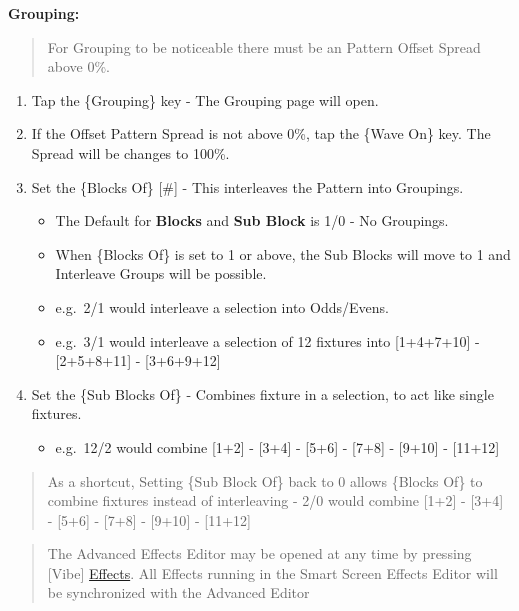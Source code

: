 \documentclass[
]{article}
\providecommand{\tightlist}{%
  \setlength{\itemsep}{0pt}\setlength{\parskip}{0pt}}
\begin{document}
\textbf{Grouping:}

\begin{quote}
For Grouping to be noticeable there must be an Pattern Offset Spread above 0\%.
\end{quote}

\begin{enumerate}
\def\labelenumi{\arabic{enumi}.}
\item
  Tap the \{Grouping\} key - The Grouping page will open.
\item
  If the Offset Pattern Spread is not above 0\%, tap the \{Wave On\} key. The Spread will be changes to 100\%.
\item
  Set the \{Blocks Of\} {[}\#{]} - This interleaves the Pattern into Groupings.

  \begin{itemize}
  \item
    The Default for \textbf{Blocks} and \textbf{Sub Block} is 1/0 - No Groupings.
  \item
    When \{Blocks Of\} is set to 1 or above, the Sub Blocks will move to 1 and Interleave Groups will be possible.
  \item
    e.g.~2/1 would interleave a selection into Odds/Evens.
  \item
    e.g.~3/1 would interleave a selection of 12 fixtures into {[}1+4+7+10{]} - {[}2+5+8+11{]} - {[}3+6+9+12{]}
  \end{itemize}
\item
  Set the \{Sub Blocks Of\} - Combines fixture in a selection, to act like single fixtures.

  \begin{itemize}
  \tightlist
  \item
    e.g.~12/2 would combine {[}1+2{]} - {[}3+4{]} - {[}5+6{]} - {[}7+8{]} - {[}9+10{]} - {[}11+12{]}
  \end{itemize}
\end{enumerate}

\begin{quote}
As a shortcut, Setting \{Sub Block Of\} back to 0 allows \{Blocks Of\} to combine fixtures instead of interleaving - 2/0 would combine {[}1+2{]} - {[}3+4{]} - {[}5+6{]} - {[}7+8{]} - {[}9+10{]} - {[}11+12{]}
\end{quote}

\begin{quote}
The Advanced Effects Editor may be opened at any time by pressing {[}Vibe{]} \protect\hyperlink{effects-1}{Effects}. All Effects running in the Smart Screen Effects Editor will be synchronized with the Advanced Editor
\end{quote}
\end{document}
